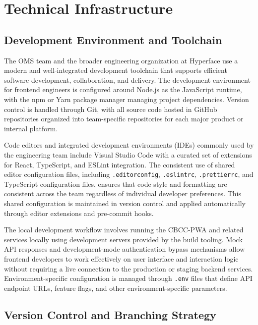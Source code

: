 \section{Technical Infrastructure}

\subsection{Development Environment and Toolchain}

The OMS team and the broader engineering organization at Hyperface use a modern and well-integrated development toolchain that supports efficient software development, collaboration, and delivery. The development environment for frontend engineers is configured around Node.js as the JavaScript runtime, with the npm or Yarn package manager managing project dependencies. Version control is handled through Git, with all source code hosted in GitHub repositories organized into team-specific repositories for each major product or internal platform.

Code editors and integrated development environments (IDEs) commonly used by the engineering team include Visual Studio Code with a curated set of extensions for React, TypeScript, and ESLint integration. The consistent use of shared editor configuration files, including \texttt{.editorconfig}, \texttt{.eslintrc}, \texttt{.prettierrc}, and TypeScript configuration files, ensures that code style and formatting are consistent across the team regardless of individual developer preferences. This shared configuration is maintained in version control and applied automatically through editor extensions and pre-commit hooks.

The local development workflow involves running the CBCC-PWA and related services locally using development servers provided by the build tooling. Mock API responses and development-mode authentication bypass mechanisms allow frontend developers to work effectively on user interface and interaction logic without requiring a live connection to the production or staging backend services. Environment-specific configuration is managed through \texttt{.env} files that define API endpoint URLs, feature flags, and other environment-specific parameters.

\subsection{Version Control and Branching Strategy}


